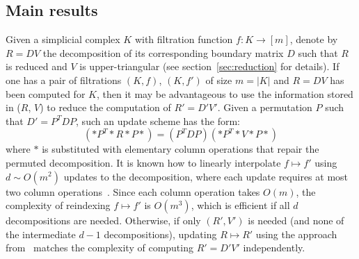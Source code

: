 \documentclass[sn-mathphys]{sn-jnl}
\begin{document}
\subsection{Main results}
Given a simplicial complex $K$ with filtration function $f : K \to [m]$, denote by $R = D V$ the decomposition of its corresponding boundary matrix $D$ such that $R$ is reduced and $V$ is upper-triangular (see section~\ref{sec:reduction} for details).
 If one has a pair of filtrations $(K, f)$,  $(K, f')$ of size $m = \lvert K \rvert$ and $R = D V$ has been computed for $K$, then it may be advantageous to use the information stored in ($R$, $V$) to reduce the computation of $R' = D' V'$. 
Given a permutation $P$ such that $D' = P^T D P$, such an update scheme has the form: 
$$ (\ast P^T \ast R \ast P \ast) = (P^T DP)(\ast P^T \ast V \ast P \ast) $$
where $\ast$ is substituted with elementary column operations that repair the permuted decomposition. It is known how to linearly interpolate $f \mapsto f'$ using $d \sim O(m^2)$ updates to the decomposition, where each update  requires at most two column operations~\cite{cohen2006vines}. Since each column operation takes $O(m)$, the complexity of reindexing $f \mapsto f'$ is $O(m^3)$, which is efficient if all $d$ decompositions are needed. Otherwise, if only $(R', V')$ is needed (and none of the intermediate $d -1$ decompositions), updating $R \mapsto R'$ using the approach from~\cite{cohen2006vines} matches the complexity of computing $R' = D' V'$ independently. 
\end{document}
